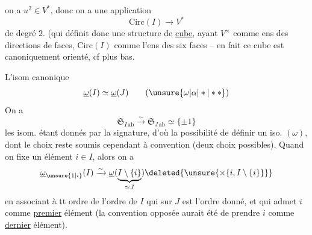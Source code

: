  on a $u^2\in V^*$, donc on a une application
\[
\mathrm{Circ}(I)\longrightarrow V^*
\]
de degré $2$. (qui définit donc une structure de \uline{cube}, ayant $V^\times$ comme ens des directions de faces, $\mathrm{Circ}(I)$ comme l'ens des six faces -- en fait ce cube est canoniquement orienté, cf plus bas.

L'isom canonique
\[
\underline{\omega}(I)\simeq\underline{\omega}(J)\tag*{$(\unsure{\omega|\alpha|*|**})$}
\]
On a
\[
\mathfrak{S}_{I\,\mathrm{ab}}\xrightarrow{\sim}\mathfrak{S}_{J\,\mathrm{ab}}\simeq\{\pm1\}
\]
les isom. étant donnés par la signature, d'où la possibilité de définir un iso.   $(\omega)$, dont le choix reste soumis cependant à convention (deux choix possibles). Quand on fixe un élément $i\in I$, alors on a
\[
\underline{\omega}_{\unsure{1|i}}(I)\xrightarrow{\sim}\underline{\omega}(\underbrace{I\setminus\{i\}}_{\simeq J})\deleted{\unsure{\times\{i,I\setminus\{i\}\}}}
\]
en associant à tt ordre  de  l'ordre   de $I$ qui sur $J$ est l'ordre donné, et qui admet $i$ comme \uline{premier} élément (la convention opposée aurait été de prendre $i$ comme \uline{dernier} élément).

